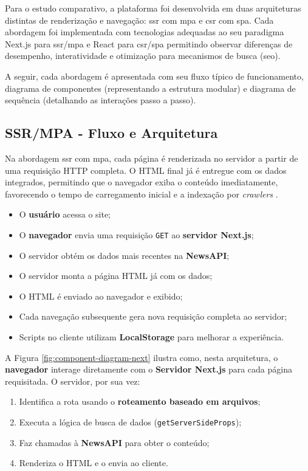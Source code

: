 Para o estudo comparativo, a plataforma foi desenvolvida em duas arquiteturas distintas de renderização e navegação: 
\acrfull{ssr} com \acrfull{mpa} e \acrfull{csr} com \acrfull{spa}.  
Cada abordagem foi implementada com tecnologias adequadas ao seu paradigma Next.js para \acrshort{ssr}/\acrshort{mpa} e React para \acrshort{csr}/\acrshort{spa}  permitindo observar diferenças de desempenho, interatividade e otimização para mecanismos de busca (\acrshort{seo}).

A seguir, cada abordagem é apresentada com seu fluxo típico de funcionamento, diagrama de componentes (representando a estrutura modular) e diagrama de sequência (detalhando as interações passo a passo).

\subsection{SSR/MPA - Fluxo e Arquitetura}
\label{subsec:ssr-mpa}

Na abordagem \acrfull{ssr} com \acrfull{mpa}, cada página é renderizada no servidor a partir de uma requisição HTTP completa. O HTML final já é entregue com os dados integrados, permitindo que o navegador exiba o conteúdo imediatamente, favorecendo o tempo de carregamento inicial e a indexação por \textit{crawlers} \cite{atori2024}.

\begin{itemize}
  \item O \textbf{usuário} acessa o site;
  \item O \textbf{navegador} envia uma requisição \texttt{GET} ao \textbf{servidor Next.js};
  \item O servidor obtém os dados mais recentes na \textbf{NewsAPI};
  \item O servidor monta a página HTML já com os dados;
  \item O HTML é enviado ao navegador e exibido;
  \item Cada navegação subsequente gera nova requisição completa ao servidor;
  \item Scripts no cliente utilizam \textbf{LocalStorage} para melhorar a experiência.
\end{itemize}
  
A Figura \ref{fig:component-diagram-next} ilustra como, nesta arquitetura, o \textbf{navegador} interage diretamente com o \textbf{Servidor Next.js} para cada página requisitada. O servidor, por sua vez:
\begin{enumerate}
  \item Identifica a rota usando o \textbf{roteamento baseado em arquivos};
  \item Executa a lógica de busca de dados (\texttt{getServerSideProps});
  \item Faz chamadas à \textbf{NewsAPI} para obter o conteúdo;
  \item Renderiza o HTML e o envia ao cliente.
\end{enumerate}


